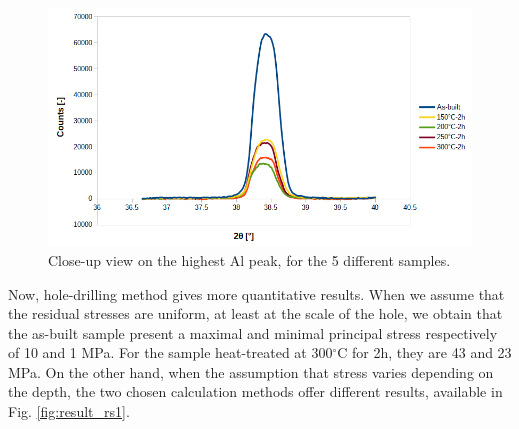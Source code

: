 \begin{figure}[ht]
	\centering
	\centerline{\includegraphics[scale=0.60]{Images/XRD_zoom}}
	\decoRule
	\caption[Close-up view on the highest Al peak, for the 5 different samples]{Close-up view on the highest Al peak, for the 5 different samples.}
	\label{fig:XRD_zoom}
\end{figure}

\begin{center}
	\begin{table}[ht]
		\noindent{}
	
	\caption[Full width at half-maximum for the cut as-built sample and the 4 cubix heat-treated samples]{Average tensile mechanical properties of the as-built specimens from batch X200-180417}
	\label{tab:fwhm}
\end{table}
\end{center}

Now, hole-drilling method gives more quantitative results. When we assume that the residual stresses are uniform, at least at the scale of the hole, we obtain that the as-built sample present a maximal and minimal principal stress respectively of 10 and 1 MPa. For the sample heat-treated at 300$^\circ$C for 2h, they are 43 and 23 MPa. On the other hand, when the assumption that stress varies depending on the depth, the two chosen calculation methods offer different results, available in Fig. \ref{fig:result_rs1}.

